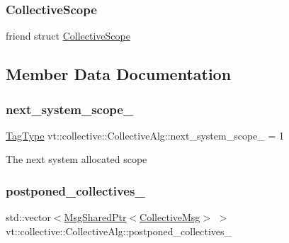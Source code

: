 \subsubsection{\texorpdfstring{Collective\+Scope}{CollectiveScope}}
{\footnotesize\ttfamily friend struct \hyperlink{structvt_1_1collective_1_1_collective_scope}{Collective\+Scope}\hspace{0.3cm}{\ttfamily [friend]}}



\subsection{Member Data Documentation}
\mbox{\label{structvt_1_1collective_1_1_collective_alg_ad830a204e2989b28cc90d54e83f518b5}} 
\subsubsection{\texorpdfstring{next\+\_\+system\+\_\+scope\+\_\+}{next\_system\_scope\_}}
{\footnotesize\ttfamily \hyperlink{namespacevt_a84ab281dae04a52a4b243d6bf62d0e52}{Tag\+Type} vt\+::collective\+::\+Collective\+Alg\+::next\+\_\+system\+\_\+scope\+\_\+ = 1\hspace{0.3cm}{\ttfamily [private]}}

The next system allocated scope \mbox{\label{structvt_1_1collective_1_1_collective_alg_ac6db64bfd14e19d0a31f69a349a452c5}} 
\subsubsection{\texorpdfstring{postponed\+\_\+collectives\+\_\+}{postponed\_collectives\_}}
{\footnotesize\ttfamily std\+::vector$<$\hyperlink{namespacevt_ab2b3d506ec8e8d1540aede826d84a239}{Msg\+Shared\+Ptr}$<$\hyperlink{structvt_1_1collective_1_1_collective_alg_1_1_collective_msg}{Collective\+Msg}$>$ $>$ vt\+::collective\+::\+Collective\+Alg\+::postponed\+\_\+collectives\+\_\+\hspace{0.3cm}{\ttfamily [private]}}

